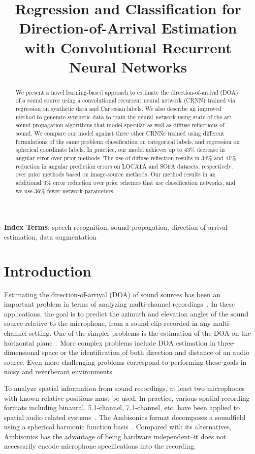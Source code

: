 \documentclass[a4paper]{article}
\title{Regression and Classification for Direction-of-Arrival Estimation with Convolutional Recurrent Neural Networks}
\begin{document}
\maketitle
\begin{abstract}


We present a novel learning-based approach to estimate the direction-of-arrival (DOA) of a sound source using a convolutional recurrent neural network (CRNN) trained via regression on synthetic data and Cartesian labels. We also describe an improved method to generate synthetic data to train the neural network using state-of-the-art sound propagation algorithms that model specular as well as diffuse reflections of sound. We compare our model against three other CRNNs trained using different formulations of the same problem: classification on categorical labels, and regression on spherical coordinate labels. In practice, our model achieves up to 43\% decrease in angular error over prior methods. The use of diffuse reflection results in 34\% and 41\% reduction in angular prediction errors on LOCATA and SOFA datasets, respectively, over prior methods based on image-source methods. Our method results in an additional 3\% error reduction over prior schemes that use classification networks, and we use 36\% fewer network parameters.

\end{abstract}
\noindent\textbf{Index Terms}: speech recognition, sound propagation, direction of arrival estimation, data augmentation


\section{Introduction}
Estimating the direction-of-arrival (DOA) of sound sources has been an important problem in terms of analyzing multi-channel recordings~\cite{knapp1976generalized, brandstein1997robust}. In these applications, the goal is to predict the azimuth and elevation angles of the sound source relative to the microphone, from a sound clip recorded in any multi-channel setting. One of the simpler problems is the estimation of the DOA on the horizontal plane~\cite{xiao2015learning}. More complex problems include DOA estimation in three-dimensional space or the identification of both direction and distance of an audio source. Even more challenging problems correspond to performing these goals in noisy and reverberant environments.

To analyze spatial information from sound recordings, at least two microphones with known relative positions must be used. In practice, various spatial recording formats including binaural, 5.1-channel, 7.1-channel, etc. have been applied to spatial audio related systems~\cite{zhang2017surround}. The Ambisonics format decomposes a soundfield using a spherical harmonic function basis~\cite{gerzon1973periphony}. Compared with its alternatives, Ambisonics has the advantage of being hardware independent--it does not necessarily encode microphone specifications into the recording.
\end{document}
